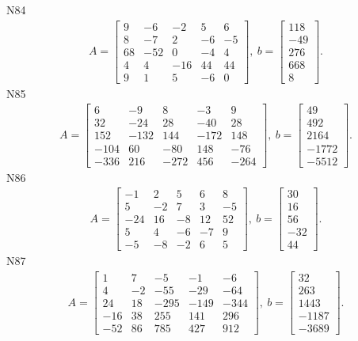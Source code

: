 \documentclass[11pt]{report}
\begin{document}
N84
\begin{align*}
 A = \left[\begin{matrix}9 & -6 & -2 & 5 & 6\\8 & -7 & 2 & -6 & -5\\68 & -52 & 0 & -4 & 4\\4 & 4 & -16 & 44 & 44\\9 & 1 & 5 & -6 & 0\end{matrix}\right],
\ b = \left[\begin{matrix}118\\-49\\276\\668\\8\end{matrix}\right]. 
 \end{align*}
N85
\begin{align*}
 A = \left[\begin{matrix}6 & -9 & 8 & -3 & 9\\32 & -24 & 28 & -40 & 28\\152 & -132 & 144 & -172 & 148\\-104 & 60 & -80 & 148 & -76\\-336 & 216 & -272 & 456 & -264\end{matrix}\right],
\ b = \left[\begin{matrix}49\\492\\2164\\-1772\\-5512\end{matrix}\right]. 
 \end{align*}
N86
\begin{align*}
 A = \left[\begin{matrix}-1 & 2 & 5 & 6 & 8\\5 & -2 & 7 & 3 & -5\\-24 & 16 & -8 & 12 & 52\\5 & 4 & -6 & -7 & 9\\-5 & -8 & -2 & 6 & 5\end{matrix}\right],
\ b = \left[\begin{matrix}30\\16\\56\\-32\\44\end{matrix}\right]. 
 \end{align*}
N87
\begin{align*}
 A = \left[\begin{matrix}1 & 7 & -5 & -1 & -6\\4 & -2 & -55 & -29 & -64\\24 & 18 & -295 & -149 & -344\\-16 & 38 & 255 & 141 & 296\\-52 & 86 & 785 & 427 & 912\end{matrix}\right],
\ b = \left[\begin{matrix}32\\263\\1443\\-1187\\-3689\end{matrix}\right]. 
 \end{align*}
\end{document}
